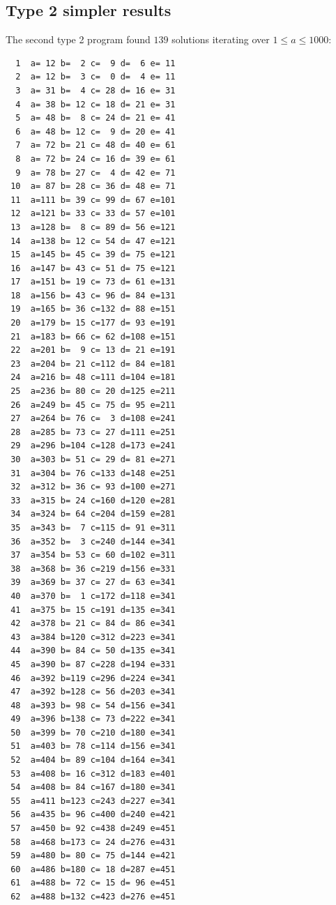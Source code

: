 \documentclass[11pt]{article}
\begin{document}
\subsection{Type 2 simpler results}
The second type 2 program found $139$ solutions iterating over $1 \leq a \leq 1000$: 
\setlength{\columnsep}{50pt}
\begin{multicols}{2}
\begin{lstlisting}
  1  a= 12 b=  2 c=  9 d=  6 e= 11
  2  a= 12 b=  3 c=  0 d=  4 e= 11
  3  a= 31 b=  4 c= 28 d= 16 e= 31
  4  a= 38 b= 12 c= 18 d= 21 e= 31
  5  a= 48 b=  8 c= 24 d= 21 e= 41
  6  a= 48 b= 12 c=  9 d= 20 e= 41
  7  a= 72 b= 21 c= 48 d= 40 e= 61
  8  a= 72 b= 24 c= 16 d= 39 e= 61
  9  a= 78 b= 27 c=  4 d= 42 e= 71
 10  a= 87 b= 28 c= 36 d= 48 e= 71
 11  a=111 b= 39 c= 99 d= 67 e=101
 12  a=121 b= 33 c= 33 d= 57 e=101
 13  a=128 b=  8 c= 89 d= 56 e=121
 14  a=138 b= 12 c= 54 d= 47 e=121
 15  a=145 b= 45 c= 39 d= 75 e=121
 16  a=147 b= 43 c= 51 d= 75 e=121
 17  a=151 b= 19 c= 73 d= 61 e=131
 18  a=156 b= 43 c= 96 d= 84 e=131
 19  a=165 b= 36 c=132 d= 88 e=151
 20  a=179 b= 15 c=177 d= 93 e=191
 21  a=183 b= 66 c= 62 d=108 e=151
 22  a=201 b=  9 c= 13 d= 21 e=191
 23  a=204 b= 21 c=112 d= 84 e=181
 24  a=216 b= 48 c=111 d=104 e=181
 25  a=236 b= 80 c= 20 d=125 e=211
 26  a=249 b= 45 c= 75 d= 95 e=211
 27  a=264 b= 76 c=  3 d=108 e=241
 28  a=285 b= 73 c= 27 d=111 e=251
 29  a=296 b=104 c=128 d=173 e=241
 30  a=303 b= 51 c= 29 d= 81 e=271
 31  a=304 b= 76 c=133 d=148 e=251
 32  a=312 b= 36 c= 93 d=100 e=271
 33  a=315 b= 24 c=160 d=120 e=281
 34  a=324 b= 64 c=204 d=159 e=281
 35  a=343 b=  7 c=115 d= 91 e=311
 36  a=352 b=  3 c=240 d=144 e=341
 37  a=354 b= 53 c= 60 d=102 e=311
 38  a=368 b= 36 c=219 d=156 e=331
 39  a=369 b= 37 c= 27 d= 63 e=341
 40  a=370 b=  1 c=172 d=118 e=341
 41  a=375 b= 15 c=191 d=135 e=341
 42  a=378 b= 21 c= 84 d= 86 e=341
 43  a=384 b=120 c=312 d=223 e=341
 44  a=390 b= 84 c= 50 d=135 e=341
 45  a=390 b= 87 c=228 d=194 e=331
 46  a=392 b=119 c=296 d=224 e=341
 47  a=392 b=128 c= 56 d=203 e=341
 48  a=393 b= 98 c= 54 d=156 e=341
 49  a=396 b=138 c= 73 d=222 e=341
 50  a=399 b= 70 c=210 d=180 e=341
 51  a=403 b= 78 c=114 d=156 e=341
 52  a=404 b= 89 c=104 d=164 e=341
 53  a=408 b= 16 c=312 d=183 e=401
 54  a=408 b= 84 c=167 d=180 e=341
 55  a=411 b=123 c=243 d=227 e=341
 56  a=435 b= 96 c=400 d=240 e=421
 57  a=450 b= 92 c=438 d=249 e=451
 58  a=468 b=173 c= 24 d=276 e=431
 59  a=480 b= 80 c= 75 d=144 e=421
 60  a=486 b=180 c= 18 d=287 e=451
 61  a=488 b= 72 c= 15 d= 96 e=451
 62  a=488 b=132 c=423 d=276 e=451

\end{lstlisting}
\end{multicols}
\end{document}
